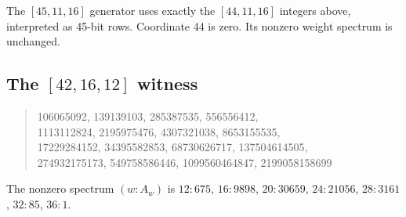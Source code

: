 The $[45,11,16]$ generator uses exactly the $[44,11,16]$ integers above, interpreted as 45-bit rows. Coordinate 44 is zero. Its nonzero weight spectrum is unchanged.

\subsection{The $[42,16,12]$ witness}
\begin{quote}\ttfamily\small
106065092, 139139103, 285387535, 556556412,\\
1113112824, 2195975476, 4307321038, 8653155535,\\
17229284152, 34395582853, 68730626717, 137504614505,\\
274932175173, 549758586446, 1099560464847, 2199058158699
\end{quote}
The nonzero spectrum $(w:A_w)$ is $12:675$, $16:9898$, $20:30659$, $24:21056$, $28:3161$, $32:85$, $36:1$.


